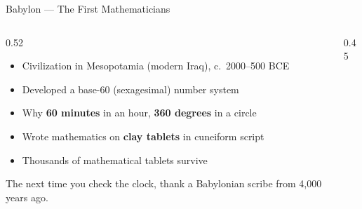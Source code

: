 \begin{frame}[shrink=11]{Babylon --- The First Mathematicians}

  \begin{columns}[T]
    \begin{column}{0.52\textwidth}
      \begin{itemize}
        \item Civilization in Mesopotamia (modern Iraq), c.\ 2000--500 BCE
        \item Developed a \alert{base-60} (sexagesimal) number system
        \item Why \textbf{60 minutes} in an hour, \textbf{360 degrees} in a circle
        \item Wrote mathematics on \textbf{clay tablets} in cuneiform script
        \item Thousands of mathematical tablets survive
      \end{itemize}

      \vspace{0.5em}
      \begin{insightbox}
        The next time you check the clock, thank a Babylonian scribe from 4,000 years ago.
      \end{insightbox}
    \end{column}

    \begin{column}{0.45\textwidth}

      \vspace{0.3em}
    \end{column}
  \end{columns}

\end{frame}


